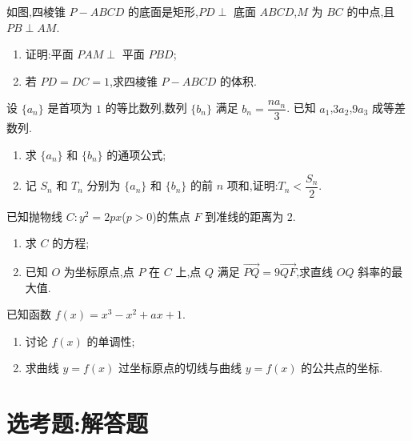\begin{problem}
如图,四棱锥 \(P-ABCD\) 的底面是矩形,\(PD\perp\) 底面 \(ABCD\),\(M\) 为 \(BC\) 的中点,且 \(PB\perp AM\).

\begin{enumerate}
\item 证明:平面 \(PAM\perp\) 平面 \(PBD\);
\item 若 \(PD=DC=1\),求四棱锥 \(P-ABCD\) 的体积.
\end{enumerate}

\end{problem}

\begin{problem}
设 \(\{a_n\}\) 是首项为 \(1\) 的等比数列,数列 \(\{b_n\}\) 满足 \(b_n=\dfrac{na_n}{3}\). 已知 \(a_1\),\(3a_2\),\(9a_3\) 成等差数列.

\begin{enumerate}
\item 求 \(\{a_n\}\) 和 \(\{b_n\}\) 的通项公式;
\item 记 \(S_n\) 和 \(T_n\) 分别为 \(\{a_n\}\) 和 \(\{b_n\}\) 的前 \(n\) 项和,证明:\(T_n<\dfrac{S_n}{2}\).
\end{enumerate}
\end{problem}

\begin{problem}
已知抛物线 \(C:y^2=2px\)(\(p>0\))的焦点 \(F\) 到准线的距离为 \(2\).

\begin{enumerate}
\item 求 \(C\) 的方程;
\item 已知 \(O\) 为坐标原点,点 \(P\) 在 \(C\) 上,点 \(Q\) 满足 \(\overrightarrow{PQ}=9\overrightarrow{QF}\),求直线 \(OQ\) 斜率的最大值.
\end{enumerate}
\end{problem}

\begin{problem}
已知函数 \(f(x)=x^3-x^2+ax+1\).

\begin{enumerate}
\item 讨论 \(f(x)\) 的单调性;
\item 求曲线 \(y=f(x)\) 过坐标原点的切线与曲线 \(y=f(x)\) 的公共点的坐标.
\end{enumerate}
\end{problem}

\section{选考题:解答题}

